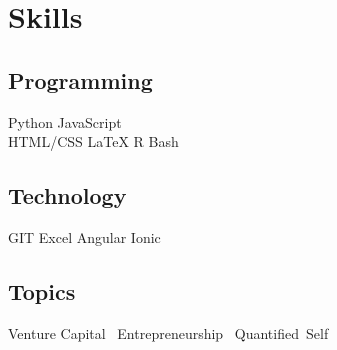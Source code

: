 \documentclass[]{deedy-resume-openfont}
\begin{document}
\begin{minipage}[t]{0.33\textwidth}

\section{Skills}
\subsection{Programming}
Python \textbullet{}
JavaScript \\
HTML/CSS \textbullet{}
LaTeX \textbullet{}
R \textbullet{}
Bash \textbullet{}
\sectionsep

\subsection{Technology}
GIT \textbullet{}
Excel \textbullet{}
Angular \textbullet{}
Ionic \textbullet{}
\sectionsep

\subsection{Topics}
Venture Capital~\textbullet{}
Entrepreneurship~\textbullet{}
Quantified~Self
\sectionsep

%
%

\end{minipage} 
\hfill
\end{document}
